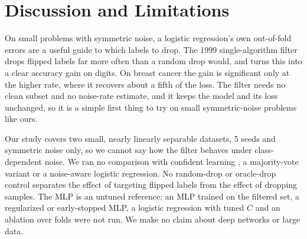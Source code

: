 \section{Discussion and Limitations}\label{sec:discussion}

On small problems with symmetric noise, a logistic regression's own out-of-fold errors are a useful guide to which labels to drop. The 1999 single-algorithm filter \citep{brodley1999identifying} drops flipped labels far more often than a random drop would, and turns this into a clear accuracy gain on digits. On breast cancer the gain is significant only at the higher rate, where it recovers about a fifth of the loss. The filter needs no clean subset and no noise-rate estimate, and it keeps the model and its loss unchanged, so it is a simple first thing to try on small symmetric-noise problems like ours.

Our study covers two small, nearly linearly separable datasets, 5 seeds and symmetric noise only, so we cannot say how the filter behaves under class-dependent noise. We ran no comparison with confident learning \citep{northcutt2021confident}, a majority-vote variant or a noise-aware logistic regression. No random-drop or oracle-drop control separates the effect of targeting flipped labels from the effect of dropping samples. The MLP is an untuned reference; an MLP trained on the filtered set, a regularized or early-stopped MLP, a logistic regression with tuned $C$ and an ablation over folds were not run. We make no claim about deep networks or large data.
